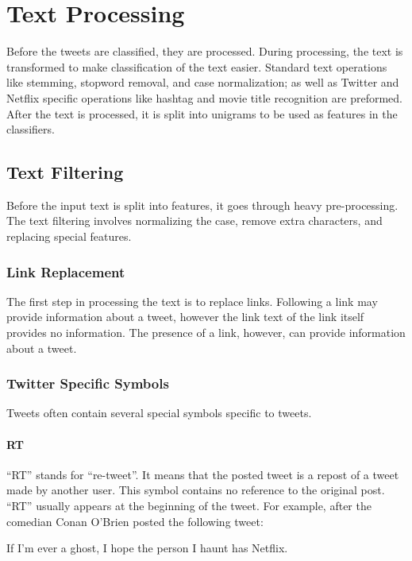 \documentclass[12pt]{ucthesis}
\begin{document}
\chapter{Text Processing}
\label{class-processing}
Before the tweets are classified, they are processed. During processing, the text is transformed
to make classification of the text easier. Standard text operations like stemming, stopword removal,
and case normalization; as well as Twitter and Netflix specific operations like hashtag and movie title
recognition are preformed. After the text is processed, it is split into unigrams to be used as features
in the classifiers.

\section{Text Filtering}
\label{class-filter}
Before the input text is split into features, it goes through heavy pre-processing.
The text filtering involves normalizing the case, remove extra characters, and replacing special features.

\subsection{Link Replacement}
\label{class-filter-link-replacement}
The first step in processing the text is to replace links.
Following a link may provide information about a tweet, however the link text of the link
itself provides no information. The presence of a link, however, can provide information about
a tweet.

\subsection{Twitter Specific Symbols}
\label{class-filter-twitter-symbols}
Tweets often contain several special symbols specific to tweets.

\subsubsection{RT}
\label{class-twitter-symbols-rt}
``RT'' stands for ``re-tweet''. It means that the posted tweet is a repost of
a tweet made by another user. This symbol contains no reference to the original post.
``RT'' usually appears at the beginning of the tweet. For example, after the comedian
Conan O'Brien posted the following tweet:

\begin{center}
   If I'm ever a ghost, I hope the person I haunt has Netflix.
\end{center}
\end{document}
